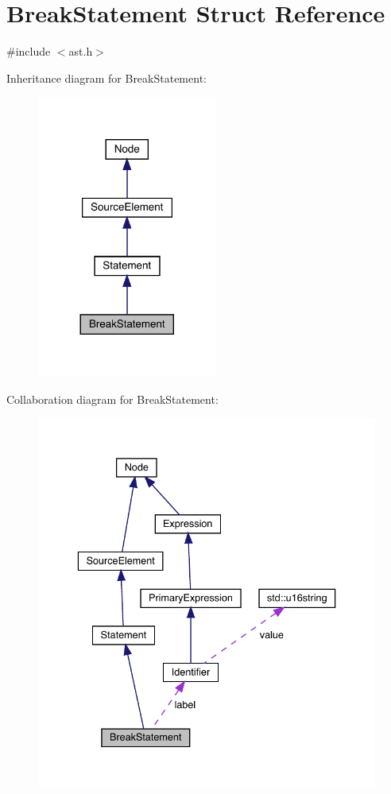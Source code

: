 \hypertarget{struct_break_statement}{}\section{Break\+Statement Struct Reference}
\label{struct_break_statement}


{\ttfamily \#include $<$ast.\+h$>$}



Inheritance diagram for Break\+Statement\+:
\nopagebreak
\begin{figure}[H]
\begin{center}
\leavevmode
\includegraphics[width=168pt]{struct_break_statement__inherit__graph}
\end{center}
\end{figure}


Collaboration diagram for Break\+Statement\+:
\nopagebreak
\begin{figure}[H]
\begin{center}
\leavevmode
\includegraphics[width=336pt]{struct_break_statement__coll__graph}
\end{center}
\end{figure}
